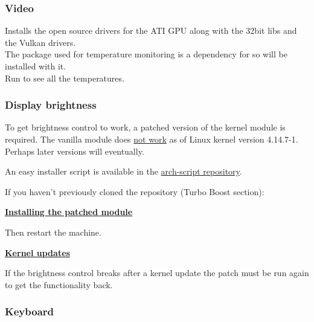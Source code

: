 \subsubsection{Video}
\begin{blocksection}
	Installs the open source drivers for the ATI GPU along with the 32bit libs and the Vulkan drivers.\\
	The \href{https://wiki.archlinux.org/index.php/Lm_sensors}{} package used for temperature monitoring is a dependency for  so will be installed with it.\\
	Run  to see all the temperatures.
\end{blocksection}

\subsubsection{Display brightness}

To get brightness control to work, a patched version of the  kernel module is required. The vanilla module does \href{https://bugzilla.kernel.org/show_bug.cgi?id=105051#c37}{not work} as of Linux kernel version 4.14.7-1. Perhaps later versions will eventually.

An easy installer script is available in the \href{https://github.com/An7ar35/arch-scripts}{arch-script repository}.

If you haven't previously cloned the repository (Turbo Boost section):


\vspace*{1em}
\textbf{\textcolor{textgrey}{\underline{Installing the patched module}}}


Then restart the machine.

\vspace*{1em}
\textbf{\textcolor{textgrey}{\underline{Kernel updates}}}

If the brightness control breaks after a kernel update the patch must be run again to get the functionality back.

\subsubsection{Keyboard}

